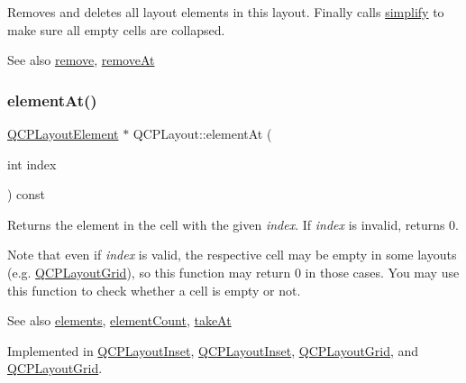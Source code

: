 Removes and deletes all layout elements in this layout. Finally calls \hyperlink{class_q_c_p_layout_a41e6ac049143866e8f8b4964efab01b2}{simplify} to make sure all empty cells are collapsed.

\begin{DoxySeeAlso}{See also}
\hyperlink{class_q_c_p_layout_a6c58f537d8086f352576ab7c5b15d0bc}{remove}, \hyperlink{class_q_c_p_layout_a2403f684fee3ce47132faaeed00bb066}{remove\+At} 
\end{DoxySeeAlso}
\mbox{\label{class_q_c_p_layout_afa73ca7d859f8a3ee5c73c9b353d2a56}} 
\subsubsection{\texorpdfstring{element\+At()}{elementAt()}}
{\footnotesize\ttfamily \hyperlink{class_q_c_p_layout_element}{Q\+C\+P\+Layout\+Element} $\ast$ Q\+C\+P\+Layout\+::element\+At (\begin{DoxyParamCaption}\item[{int}]{index }\end{DoxyParamCaption}) const\hspace{0.3cm}{\ttfamily [pure virtual]}}

Returns the element in the cell with the given {\itshape index}. If {\itshape index} is invalid, returns 0.

Note that even if {\itshape index} is valid, the respective cell may be empty in some layouts (e.\+g. \hyperlink{class_q_c_p_layout_grid}{Q\+C\+P\+Layout\+Grid}), so this function may return 0 in those cases. You may use this function to check whether a cell is empty or not.

\begin{DoxySeeAlso}{See also}
\hyperlink{class_q_c_p_layout_aca129722c019f91d3367046f80abfa77}{elements}, \hyperlink{class_q_c_p_layout_a39d3e9ef5d9b82ab1885ba1cb9597e56}{element\+Count}, \hyperlink{class_q_c_p_layout_a5a79621fa0a6eabb8b520cfc04fb601a}{take\+At} 
\end{DoxySeeAlso}


Implemented in \hyperlink{class_q_c_p_layout_inset_a881ca205605bae9c034733b808f93a02}{Q\+C\+P\+Layout\+Inset}, \hyperlink{class_q_c_p_layout_inset_a747a1c6f09d24e34b9179ecad2658066}{Q\+C\+P\+Layout\+Inset}, \hyperlink{class_q_c_p_layout_grid_a4288f174082555f6bd92021bdedb75dc}{Q\+C\+P\+Layout\+Grid}, and \hyperlink{class_q_c_p_layout_grid_a8b420c8ecfcd5cfb3673c2dfa0577286}{Q\+C\+P\+Layout\+Grid}.


